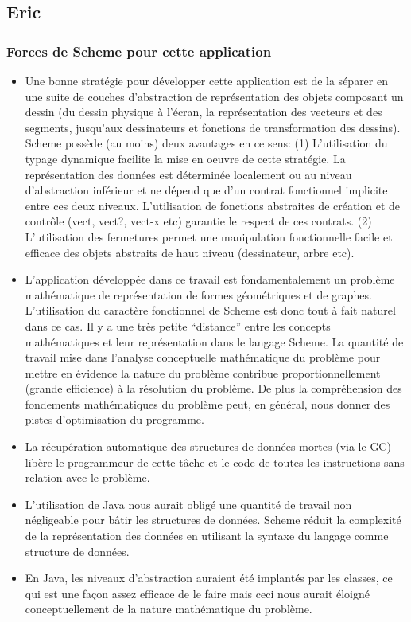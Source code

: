 \documentclass[10pt]{article}
\begin{document}
\subsection{Eric}

\subsubsection{Forces de Scheme pour cette application}

\begin{itemize}
\item Une bonne stratégie pour développer cette application est de la
  séparer en une suite de couches d'abstraction de représentation des
  objets composant un dessin (du dessin physique à l'écran, la
  représentation des vecteurs et des segments, jusqu'aux dessinateurs
  et fonctions de transformation des dessins). Scheme possède (au
  moins) deux avantages en ce sens: (1) L'utilisation du typage
  dynamique facilite la mise en oeuvre de cette stratégie. La
  représentation des données est déterminée localement ou au niveau
  d'abstraction inférieur et ne dépend que d'un contrat fonctionnel
  implicite entre ces deux niveaux. L'utilisation de fonctions
  abstraites de création et de contrôle (vect, vect?, vect-x etc)
  garantie le respect de ces contrats. (2) L'utilisation des
  fermetures permet une manipulation fonctionnelle facile et efficace
  des objets abstraits de haut niveau (dessinateur, arbre etc).
\item L'application développée dans ce travail est fondamentalement un
  problème mathématique de représentation de formes géométriques et de
  graphes. L'utilisation du caractère fonctionnel de Scheme est donc
  tout à fait naturel dans ce cas. Il y a une très petite ``distance''
  entre les concepts mathématiques et leur représentation dans le
  langage Scheme. La quantité de travail mise dans l'analyse
  conceptuelle mathématique du problème pour mettre en évidence la
  nature du problème contribue proportionnellement (grande efficience)
  à la résolution du problème. De plus la compréhension des fondements
  mathématiques du problème peut, en général, nous donner des pistes
  d'optimisation du programme.
\item La récupération automatique des structures de données mortes
  (via le GC) libère le programmeur de cette tâche et le code de
  toutes les instructions sans relation avec le problème.
\item L'utilisation de Java nous aurait obligé une quantité de travail
  non négligeable pour bâtir les structures de données. Scheme réduit
  la complexité de la représentation des données en utilisant la
  syntaxe du langage comme structure de données.
\item En Java, les niveaux d'abstraction auraient été implantés par
  les classes, ce qui est une façon assez efficace de le faire mais
  ceci nous aurait éloigné conceptuellement de la nature mathématique
  du problème.
\end{itemize}
\end{document}

